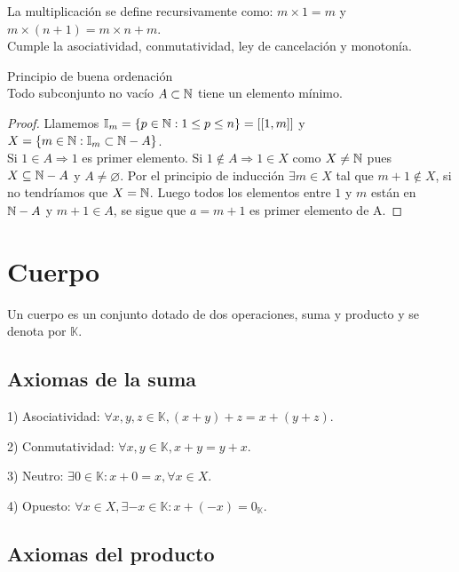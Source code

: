 \begin{definition}
    La multiplicación se define recursivamente como: $m \times 1 =m$ y $m \times (n+1) = m \times n + m$. \\
    Cumple la asociatividad, conmutatividad, ley de cancelación y monotonía.
\end{definition}

\begin{theorem}
    Principio de buena ordenación \\
    Todo subconjunto no vacío $A \subset \mathbb{N}$ tiene un elemento mínimo.
    \begin{proof}
        Llamemos $\mathbb{I}_m = \{ p \in \mathbb{N} : 1 \leq p \leq n \} = [[ 1, m ]]$ y $X = \{ m \in \mathbb{N} : \mathbb{I}_m \subset \mathbb{N} - A \}$. \\
        Si $1 \in A \Rightarrow 1$ es primer elemento.
        Si $1 \notin A \Rightarrow 1 \in X$ como $X \neq \mathbb{N}$ pues $X \subseteq \mathbb{N} - A$ y $A \neq \varnothing$.
        Por el principio de inducción $\exists m \in X$ tal que $m+1 \notin X$, si no tendríamos que $X = \mathbb{N}$. Luego todos los elementos entre $1$ y $m$ están en $\mathbb{N} - A$ y $m+1 \in A$, se sigue que $a = m+1$ es primer elemento de A. 
    \end{proof}
\end{theorem}


\section{Cuerpo}

Un cuerpo es un conjunto dotado de dos operaciones, suma y producto y se denota por $\mathbb{K}$. 

\subsection{Axiomas de la suma}

1) Asociatividad: $\forall x,y,z \in \mathbb{K}, (x+y)+z=x+(y+z)$.

2) Conmutatividad: $\forall x,y \in \mathbb{K}, x+y=y+x$.

3) Neutro: $\exists 0 \in \mathbb{K} :x+0 = x, \forall x \in X$.

4) Opuesto: $\forall x \in X, \exists -x \in \mathbb{K} : x +(-x) = 0_\mathbb{K}$. 

\subsection{Axiomas del producto}

